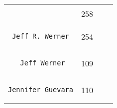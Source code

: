 \documentclass[]{article}
\begin{document}
\begin{longtable}[c]{@{}llll@{}}
\begin{minipage}[t]{0.39\columnwidth}
\begin{verbatim}
\end{verbatim}
\end{minipage} & \begin{minipage}[t]{0.10\columnwidth}\raggedright
258
\end{minipage} & \begin{minipage}[t]{0.13\columnwidth}\raggedright
\end{minipage} & \begin{minipage}[t]{0.15\columnwidth}\raggedright
\end{minipage}
\\\noalign{\medskip}
\begin{minipage}[t]{0.39\columnwidth}\raggedright
\begin{verbatim}
 Jeff R. Werner
\end{verbatim}
\end{minipage} & \begin{minipage}[t]{0.10\columnwidth}\raggedright
254
\end{minipage} & \begin{minipage}[t]{0.13\columnwidth}\raggedright
\end{minipage} & \begin{minipage}[t]{0.15\columnwidth}\raggedright
\end{minipage}
\\\noalign{\medskip}
\begin{minipage}[t]{0.39\columnwidth}\raggedright
\begin{verbatim}
   Jeff Werner
\end{verbatim}
\end{minipage} & \begin{minipage}[t]{0.10\columnwidth}\raggedright
109
\end{minipage} & \begin{minipage}[t]{0.13\columnwidth}\raggedright
\end{minipage} & \begin{minipage}[t]{0.15\columnwidth}\raggedright
\end{minipage}
\\\noalign{\medskip}
\begin{minipage}[t]{0.39\columnwidth}\raggedright
\begin{verbatim}
Jennifer Guevara
\end{verbatim}
\end{minipage} & \begin{minipage}[t]{0.10\columnwidth}\raggedright
110
\end{minipage} & \begin{minipage}[t]{0.13\columnwidth}\raggedright

\end{minipage}
\end{longtable}
\end{document}
